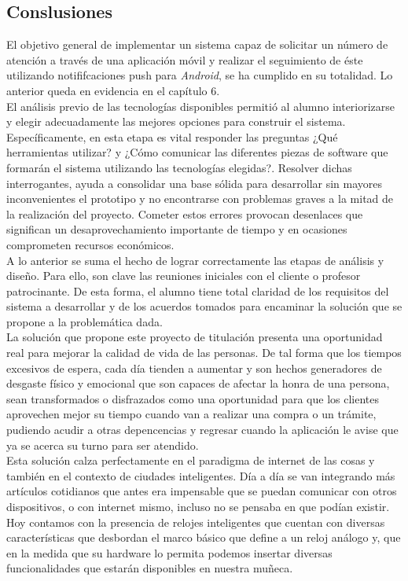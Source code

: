 
\subsection{Conslusiones}

El objetivo general de implementar un sistema capaz de solicitar un número de atención a través de una aplicación móvil y realizar el seguimiento de éste utilizando notififcaciones push para \textit{Android}, se ha cumplido en su totalidad. Lo anterior queda en evidencia en el capítulo 6.\\

El análisis previo de las tecnologías disponibles permitió al alumno interiorizarse y elegir adecuadamente las mejores opciones para  construir el sistema. Específicamente, en esta etapa es vital responder las preguntas ¿Qué herramientas utilizar? y ¿Cómo comunicar las diferentes piezas de software que formarán el sistema utilizando las tecnologías elegidas?. Resolver dichas interrogantes, ayuda a consolidar una base sólida para desarrollar sin mayores inconvenientes el prototipo y no encontrarse con problemas graves a la mitad de la realización del proyecto. Cometer estos errores provocan desenlaces que significan un desaprovechamiento importante de tiempo y en  ocasiones comprometen recursos económicos.\\

A lo anterior se suma el hecho de lograr correctamente las etapas de análisis y diseño. Para ello, son clave las reuniones iniciales con el cliente o profesor patrocinante. De esta forma, el alumno tiene total claridad de los requisitos del sistema a desarrollar y de los acuerdos tomados para encaminar la solución que se propone a la problemática dada.\\

La solución que propone este proyecto de titulación presenta una oportunidad real para mejorar la calidad de vida de las personas. De tal forma que los tiempos excesivos de espera, cada día tienden a aumentar y son hechos generadores de desgaste físico y emocional que son capaces de afectar la honra de una persona, sean transformados o disfrazados como una oportunidad para que los clientes aprovechen mejor su tiempo cuando van a realizar una compra o un trámite, pudiendo acudir a otras depencencias y regresar cuando la aplicación le avise que ya se acerca su turno para ser atendido.\\

Esta solución calza perfectamente en el paradigma de internet de las cosas y también en el contexto de ciudades inteligentes. Día a día se van integrando más artículos cotidianos que antes era impensable que se puedan comunicar con otros dispositivos, o con internet mismo, incluso no se pensaba en que podían existir. Hoy contamos con la presencia de relojes inteligentes que cuentan con diversas características que desbordan el marco básico que define a un reloj análogo y, que en la medida que su hardware lo permita podemos insertar diversas funcionalidades que estarán disponibles en nuestra muñeca.\\


